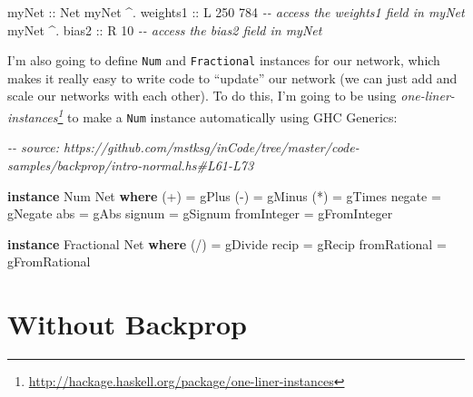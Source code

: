 \documentclass[]{article}
\newenvironment{Shaded}{}{}
\newcommand{\CommentTok}[1]{\textcolor[rgb]{0.38,0.63,0.69}{\textit{#1}}}
\newcommand{\DataTypeTok}[1]{\textcolor[rgb]{0.56,0.13,0.00}{#1}}
\newcommand{\DecValTok}[1]{\textcolor[rgb]{0.25,0.63,0.44}{#1}}
\newcommand{\FunctionTok}[1]{\textcolor[rgb]{0.02,0.16,0.49}{#1}}
\newcommand{\KeywordTok}[1]{\textcolor[rgb]{0.00,0.44,0.13}{\textbf{#1}}}
\newcommand{\NormalTok}[1]{#1}
\newcommand{\OperatorTok}[1]{\textcolor[rgb]{0.40,0.40,0.40}{#1}}
\newcommand{\OtherTok}[1]{\textcolor[rgb]{0.00,0.44,0.13}{#1}}
\renewcommand{\href}[2]{#2\footnote{\url{#1}}}
\begin{document}
\begin{Shaded}
\begin{Highlighting}[]
\OtherTok{myNet             ::} \DataTypeTok{Net}
\NormalTok{myNet }\OperatorTok{\^{}.}\OtherTok{ weights1 ::} \DataTypeTok{L} \DecValTok{250} \DecValTok{784}  \CommentTok{{-}{-} access the weights1 field in myNet}
\NormalTok{myNet }\OperatorTok{\^{}.}\OtherTok{ bias2    ::} \DataTypeTok{R}  \DecValTok{10}      \CommentTok{{-}{-} access the bias2 field in myNet}
\end{Highlighting}
\end{Shaded}

I'm also going to define \texttt{Num} and \texttt{Fractional} instances for our
network, which makes it really easy to write code to ``update'' our network (we
can just add and scale our networks with each other). To do this, I'm going to
be using
\emph{\href{http://hackage.haskell.org/package/one-liner-instances}{one-liner-instances}}
to make a \texttt{Num} instance automatically using GHC Generics:

\begin{Shaded}
\begin{Highlighting}[]
\CommentTok{{-}{-} source: https://github.com/mstksg/inCode/tree/master/code{-}samples/backprop/intro{-}normal.hs\#L61{-}L73}

\KeywordTok{instance} \DataTypeTok{Num} \DataTypeTok{Net} \KeywordTok{where}
\NormalTok{    (}\OperatorTok{+}\NormalTok{)         }\OtherTok{=}\NormalTok{ gPlus}
\NormalTok{    (}\OperatorTok{{-}}\NormalTok{)         }\OtherTok{=}\NormalTok{ gMinus}
\NormalTok{    (}\OperatorTok{*}\NormalTok{)         }\OtherTok{=}\NormalTok{ gTimes}
    \FunctionTok{negate}      \OtherTok{=}\NormalTok{ gNegate}
    \FunctionTok{abs}         \OtherTok{=}\NormalTok{ gAbs}
    \FunctionTok{signum}      \OtherTok{=}\NormalTok{ gSignum}
    \FunctionTok{fromInteger} \OtherTok{=}\NormalTok{ gFromInteger}

\KeywordTok{instance} \DataTypeTok{Fractional} \DataTypeTok{Net} \KeywordTok{where}
\NormalTok{    (}\OperatorTok{/}\NormalTok{)          }\OtherTok{=}\NormalTok{ gDivide}
    \FunctionTok{recip}        \OtherTok{=}\NormalTok{ gRecip}
    \FunctionTok{fromRational} \OtherTok{=}\NormalTok{ gFromRational}
\end{Highlighting}
\end{Shaded}

\section{Without Backprop}\label{without-backprop}
\end{document}
